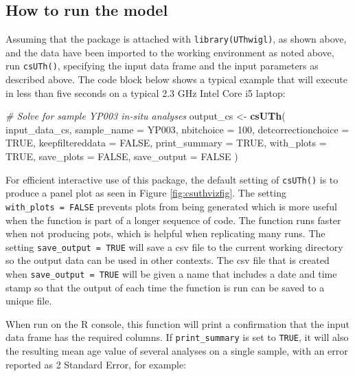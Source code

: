 \documentclass[]{elsarticle} %
\newenvironment{Shaded}{\begin{snugshade}}{\end{snugshade}}
\newcommand{\CommentTok}[1]{\textcolor[rgb]{0.56,0.35,0.01}{\textit{#1}}}
\newcommand{\DataTypeTok}[1]{\textcolor[rgb]{0.13,0.29,0.53}{#1}}
\newcommand{\DecValTok}[1]{\textcolor[rgb]{0.00,0.00,0.81}{#1}}
\newcommand{\KeywordTok}[1]{\textcolor[rgb]{0.13,0.29,0.53}{\textbf{#1}}}
\newcommand{\NormalTok}[1]{#1}
\newcommand{\OtherTok}[1]{\textcolor[rgb]{0.56,0.35,0.01}{#1}}
\newcommand{\StringTok}[1]{\textcolor[rgb]{0.31,0.60,0.02}{#1}}
\begin{document}
\hypertarget{how-to-run-the-model}{%
\subsection{How to run the model}\label{how-to-run-the-model}}

Assuming that the package is attached with \texttt{library(UThwigl)}, as shown above, and the data have been imported to the working environment as noted above, run \texttt{csUTh()}, specifying the input data frame and the input parameters as described above. The code block below shows a typical example that will execute in less than five seconds on a typical 2.3 GHz Intel Core i5 laptop:

\begin{Shaded}
\begin{Highlighting}[]
\CommentTok{\# Solve for sample YP003 in{-}situ analyses}
\NormalTok{output\_cs \textless{}{-}}
\StringTok{  }\KeywordTok{csUTh}\NormalTok{(}
\NormalTok{    input\_data\_cs,}
    \DataTypeTok{sample\_name =} \StringTok{\textquotesingle{}YP003\textquotesingle{}}\NormalTok{,}
    \DataTypeTok{nbitchoice =} \DecValTok{100}\NormalTok{,}
    \DataTypeTok{detcorrectionchoice =} \OtherTok{TRUE}\NormalTok{,}
    \DataTypeTok{keepfiltereddata =} \OtherTok{FALSE}\NormalTok{,}
    \DataTypeTok{print\_summary =} \OtherTok{TRUE}\NormalTok{,}
    \DataTypeTok{with\_plots =} \OtherTok{TRUE}\NormalTok{,}
    \DataTypeTok{save\_plots =} \OtherTok{FALSE}\NormalTok{,}
    \DataTypeTok{save\_output =} \OtherTok{FALSE}
\NormalTok{  )}
\end{Highlighting}
\end{Shaded}

For efficient interactive use of this package, the default setting of \texttt{csUTh()} is to produce a panel plot as seen in Figure \ref{fig:csuthvizfig}. The setting \texttt{with\_plots\ =\ FALSE} prevents plots from being generated which is more useful when the function is part of a longer sequence of code. The function runs faster when not producing pots, which is helpful when replicating many runs. The setting \texttt{save\_output\ =\ TRUE} will save a csv file to the current working directory so the output data can be used in other contexts. The csv file that is created when \texttt{save\_output\ =\ TRUE} will be given a name that includes a date and time stamp so that the output of each time the function is run can be saved to a unique file.

When run on the R console, this function will print a confirmation that the input data frame has the required columns. If \texttt{print\_summary} is set to \texttt{TRUE}, it will also the resulting mean age value of several analyses on a single sample, with an error reported as 2 Standard Error, for example:
\end{document}
